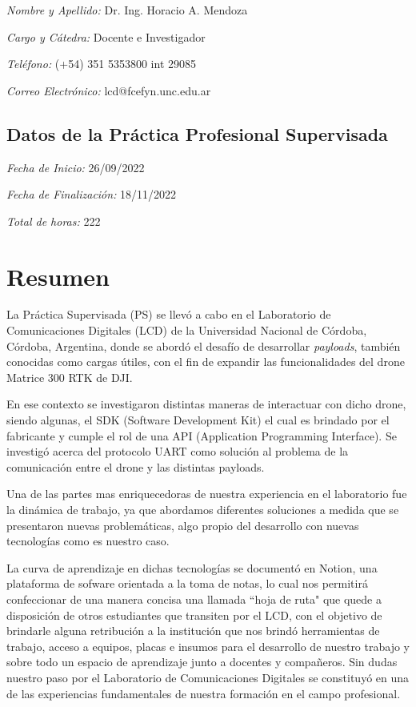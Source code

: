 \documentclass[12pt]{article}
\begin{document}
\textsl{Nombre y Apellido:} Dr. Ing. Horacio A. Mendoza

\textsl{Cargo y Cátedra:} Docente e Investigador

\textsl{Teléfono:} (+54) 351 5353800 int 29085

\textsl{Correo Electrónico:} lcd@fcefyn.unc.edu.ar

\subsection{Datos de la Práctica Profesional Supervisada}

\textsl{Fecha de Inicio:} 26/09/2022

\textsl{Fecha de Finalización:} 18/11/2022

\textsl{Total de horas:} 222

\tableofcontents
\newpage

\justifying
\section{Resumen}
La Práctica Supervisada (PS) se llevó a cabo en el Laboratorio de Comunicaciones Digitales (LCD) de la Universidad Nacional de Córdoba, Córdoba, Argentina, donde se abordó el desafío de desarrollar \textit{payloads}, también conocidas como cargas útiles, con el fin de expandir las funcionalidades del drone Matrice 300 RTK de DJI.

En ese contexto se investigaron distintas maneras de interactuar con dicho drone, siendo algunas, el SDK (Software Development Kit) el cual es brindado por el fabricante y cumple el rol de una API (Application Programming Interface). Se investigó acerca del protocolo UART como solución al problema de la comunicación entre el drone y las distintas payloads.

Una de las partes mas enriquecedoras de nuestra experiencia en el laboratorio fue la dinámica de trabajo, ya que abordamos diferentes soluciones a medida que se presentaron nuevas problemáticas, algo propio del desarrollo con nuevas tecnologías como es nuestro caso. 

La curva de aprendizaje en dichas tecnologías se documentó en Notion, una plataforma de sofware orientada a la toma de notas, lo cual nos permitirá confeccionar de una manera concisa una llamada ``hoja de ruta"  que quede a disposición de otros estudiantes que transiten por el LCD, con el objetivo de brindarle alguna retribución a la institución que nos brindó herramientas de trabajo, acceso a equipos, placas e insumos para el desarrollo de nuestro trabajo y sobre todo un espacio de aprendizaje junto a docentes y compañeros. Sin dudas nuestro paso por el Laboratorio de Comunicaciones Digitales se constituyó en una de las experiencias fundamentales de nuestra formación en el campo profesional.
\end{document}

